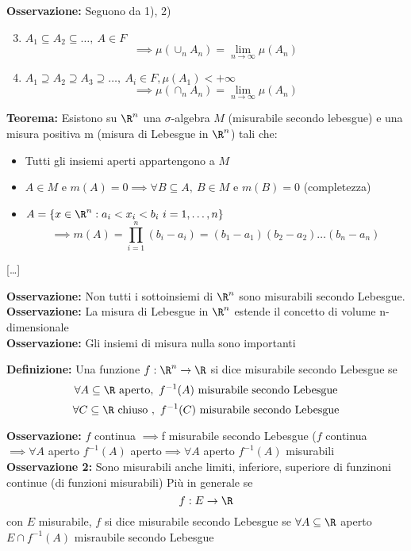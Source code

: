 \textbf{Osservazione:} Seguono da 1), 2)
\begin{enumerate}
\setcounter{enumi}{2}
	\item $A_1\subseteq A_2\subseteq \ldots,\ A\in F$\[\implies \mu(\cup_n A_n)=\lim_{n \to \infty} \mu(A_n)\]
	\item $A_1 \supseteq A_2\supseteq A_3\supseteq \ldots, \ A_i\in F,\mu (A_1)<+\infty$\[\implies\mu( \cap_n A_n)=\lim_{n \to \infty}\mu(A_n)\] 
\end{enumerate}
\begin{tcolorbox}
	\textbf{Teorema:} Esistono su $\R^n$ una $\sigma$-algebra $M$ (misurabile secondo lebesgue) e una misura positiva m (misura di Lebesgue in $\R^n$) tali che:
	\begin{itemize}
		\item Tutti gli insiemi aperti appartengono a $M$
		\item $A\in M$ e $m(A)=0\implies\forall B\subseteq A,\ B\in M \text{ e } m(B)=0$ (completezza)
		\item $A=\{x\in \R^n: a_i<x_i<b_i\ i=1,\ldots,n\}$\[\implies m(A)=\prod_{i=1}^n(b_i-a_i)=(b_1-a_1)(b_2-a_2)\ldots(b_n-a_n)\]
	\end{itemize}
	[\ldots] 
\end{tcolorbox}
\textbf{Osservazione: }Non tutti i sottoinsiemi di $\R^n$ sono misurabili secondo Lebesgue.
\\\textbf{Osservazione: }La misura di Lebesgue in $\R^n$ estende il concetto di volume n-dimensionale
\\\textbf{Osservazione:} Gli insiemi di misura nulla sono importanti 
\begin{tcolorbox}
	\textbf{Definizione:} Una funzione $f:\R^n\to \R$ si dice misurabile secondo Lebesgue se
	\[\forall A\subseteq \R \text{ aperto},\ f^{-1}(A) \text{ misurabile secondo Lebesgue}\]
	\[\forall C\subseteq\R\text{ chiuso }, \ f^{-1}(C)\text{ misurabile secondo Lebesgue}\]
\end{tcolorbox}
\textbf{Osservazione:} $f$ continua $\implies$f misurabile secondo Lebesgue ($f$ continua $\implies\forall A$ aperto $f^{-1}(A)$ aperto$\implies \forall  A$ aperto $f^{-1}(A)$ misurabili
\\\textbf{Osservazione 2:} Sono misurabili anche limiti, inferiore, superiore di funzinoni continue (di funzioni misurabili)\bigbreak
Più in generale se 
\[f: E\to \R\] con $E$ misurabile, $f$ si dice misurabile secondo Lebesgue se $\forall  A\subseteq\R$ aperto $E\cap f^{-1}(A)$ misraubile secondo Lebesgue
